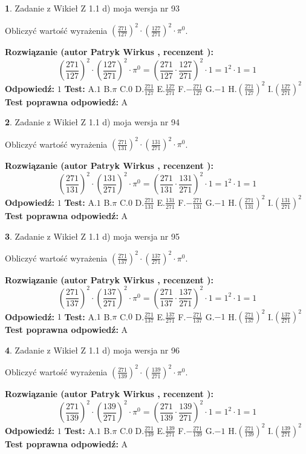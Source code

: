 \documentclass[12pt, a4paper]{article}
\theoremstyle{definition} %
\newtheorem{zad}{}
\newcommand{\zadStart}[1]{\begin{zad}#1\newline}
\newcommand{\zadStop}{\end{zad}}
\newcommand{\rozwStart}[2]{\noindent \textbf{Rozwiązanie (autor #1 , recenzent #2): }\newline}
\newcommand{\rozwStop}{\newline}
\newcommand{\odpStart}{\noindent \textbf{Odpowiedź:}\newline}
\newcommand{\odpStop}{\newline}
\newcommand{\testStart}{\noindent \textbf{Test:}\newline}
\newcommand{\testStop}{\newline}
\newcommand{\kluczStart}{\noindent \textbf{Test poprawna odpowiedź:}\newline}
\newcommand{\kluczStop}{\newline}
\begin{document}
\zadStart{Zadanie z Wikieł Z 1.1 d) moja wersja nr 93}

Obliczyć wartość wyrażenia $(\frac{271}{127})^{2} \cdot (\frac{127}{271})^{2} \cdot \pi^{0}$.
\zadStop
\rozwStart{Patryk Wirkus}{}
$$(\frac{271}{127})^{2} \cdot (\frac{127}{271})^{2} \cdot \pi^{0} = (\frac{271}{127} \cdot \frac{127}{271})^{2} \cdot 1 = 1^{2} \cdot 1 = 1$$
\rozwStop
\odpStart
$1$
\odpStop
\testStart
A.$1$ B.$\pi$ C.$0$ D.$\frac{271}{127}$ E.$\frac{127}{271}$
F.$-\frac{271}{127}$ G.$-1$
H.$(\frac{271}{127})^{2}$
I.$(\frac{127}{271})^{2}$
\testStop
\kluczStart
A
\kluczStop



\zadStart{Zadanie z Wikieł Z 1.1 d) moja wersja nr 94}

Obliczyć wartość wyrażenia $(\frac{271}{131})^{2} \cdot (\frac{131}{271})^{2} \cdot \pi^{0}$.
\zadStop
\rozwStart{Patryk Wirkus}{}
$$(\frac{271}{131})^{2} \cdot (\frac{131}{271})^{2} \cdot \pi^{0} = (\frac{271}{131} \cdot \frac{131}{271})^{2} \cdot 1 = 1^{2} \cdot 1 = 1$$
\rozwStop
\odpStart
$1$
\odpStop
\testStart
A.$1$ B.$\pi$ C.$0$ D.$\frac{271}{131}$ E.$\frac{131}{271}$
F.$-\frac{271}{131}$ G.$-1$
H.$(\frac{271}{131})^{2}$
I.$(\frac{131}{271})^{2}$
\testStop
\kluczStart
A
\kluczStop



\zadStart{Zadanie z Wikieł Z 1.1 d) moja wersja nr 95}

Obliczyć wartość wyrażenia $(\frac{271}{137})^{2} \cdot (\frac{137}{271})^{2} \cdot \pi^{0}$.
\zadStop
\rozwStart{Patryk Wirkus}{}
$$(\frac{271}{137})^{2} \cdot (\frac{137}{271})^{2} \cdot \pi^{0} = (\frac{271}{137} \cdot \frac{137}{271})^{2} \cdot 1 = 1^{2} \cdot 1 = 1$$
\rozwStop
\odpStart
$1$
\odpStop
\testStart
A.$1$ B.$\pi$ C.$0$ D.$\frac{271}{137}$ E.$\frac{137}{271}$
F.$-\frac{271}{137}$ G.$-1$
H.$(\frac{271}{137})^{2}$
I.$(\frac{137}{271})^{2}$
\testStop
\kluczStart
A
\kluczStop



\zadStart{Zadanie z Wikieł Z 1.1 d) moja wersja nr 96}

Obliczyć wartość wyrażenia $(\frac{271}{139})^{2} \cdot (\frac{139}{271})^{2} \cdot \pi^{0}$.
\zadStop
\rozwStart{Patryk Wirkus}{}
$$(\frac{271}{139})^{2} \cdot (\frac{139}{271})^{2} \cdot \pi^{0} = (\frac{271}{139} \cdot \frac{139}{271})^{2} \cdot 1 = 1^{2} \cdot 1 = 1$$
\rozwStop
\odpStart
$1$
\odpStop
\testStart
A.$1$ B.$\pi$ C.$0$ D.$\frac{271}{139}$ E.$\frac{139}{271}$
F.$-\frac{271}{139}$ G.$-1$
H.$(\frac{271}{139})^{2}$
I.$(\frac{139}{271})^{2}$
\testStop
\kluczStart
A
\kluczStop
\end{document}
